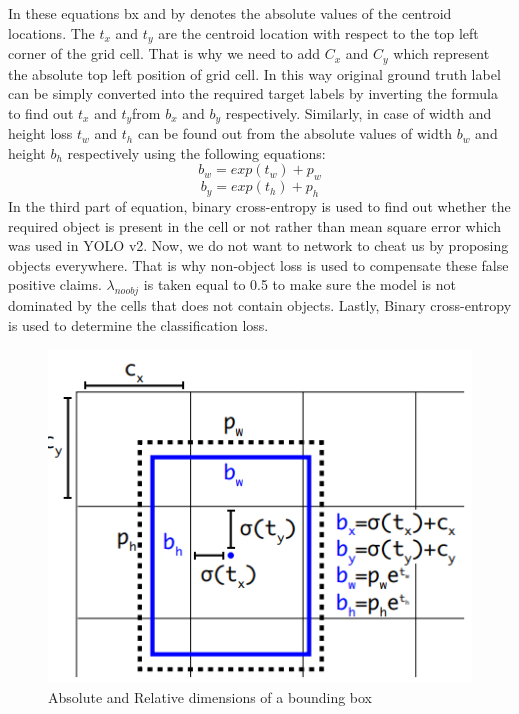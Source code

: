 In these equations bx and by denotes the absolute values of the centroid locations. The $t_{x}$ and $t_{y}$ are the centroid location with respect to the top left corner of the grid cell. That is why we need to add $C_{x}$ and $C_{y}$ which represent the absolute top left position of grid cell. In this way original ground truth label can be simply converted into the required target labels by inverting the formula to find out $t_{x}$ and $t_{y}$from $b_{x}$ and $b_{y}$ respectively. Similarly, in case of  width and height loss $t_w$ and $t_h$ can be found out from the absolute values of width $b_w$ and height $b_h$ respectively using the following equations:
\begin{equation}
    b_w = exp(t_w) + p_w
\end{equation}
\begin{equation}
    b_y = exp(t_h) + p_h
\end{equation}
In the third part of equation, binary cross-entropy is used to find out whether the required object is present in the cell or not rather than mean square error which was used in YOLO v2. Now, we do not want to network to cheat us by proposing objects everywhere. That is why non-object loss is used to compensate these false positive claims. $\lambda_{noobj}$ is taken equal to 0.5 to make sure the model is not dominated by the cells that does not contain objects. Lastly, Binary cross-entropy is used to determine the classification loss.
  \begin{figure}[H]
    \centering
    \captionsetup{justification = centering}
    \includegraphics[scale= 0.7]{CHAPTERS/Chapter-5/images/5.5.PNG}
    \caption{Absolute and Relative dimensions of a bounding box} 
    \label{fig:5.5}
  \end{figure}
  

